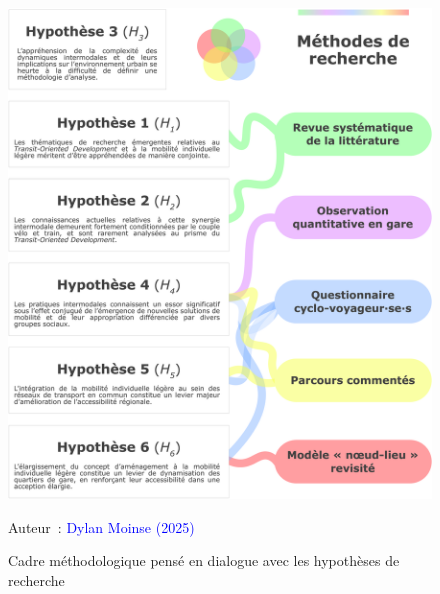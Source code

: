 \begin{refsegment}
    \begin{figure}[h!]\vspace*{4pt}
        \caption{Cadre méthodologique pensé en dialogue avec les hypothèses de recherche}
        \label{fig-introduction:methodes-hypotheses}
        \centerline{\includegraphics[width=1\columnwidth]{src/Figures/Introduction/FR_Methodologie_hypotheses.pdf}}
        \vspace{5pt}
        \begin{flushright}\scriptsize{
        Auteur~: \textcolor{blue}{Dylan Moinse (2025)}
        }\end{flushright}
    \end{figure}


\end{refsegment}
